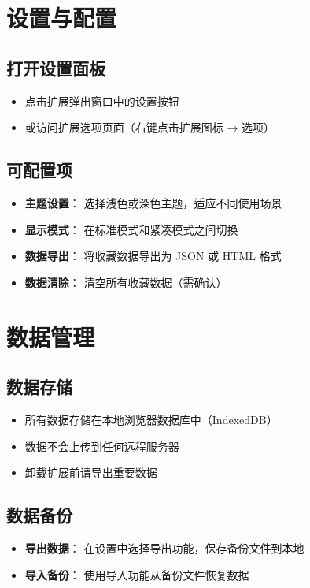 \documentclass[10pt,a4paper]{article}
\newcommand{\stepitem}[2]{%
  \item \textbf{#1}：#2
}
\begin{document}
\begin{itemize}
\begin{itemize}
\begin{itemize}
\section{设置与配置}

\subsection{打开设置面板}
\begin{itemize}
  \item 点击扩展弹出窗口中的设置按钮
  \item 或访问扩展选项页面（右键点击扩展图标 → 选项）
\end{itemize}

\subsection{可配置项}
\begin{itemize}
  \stepitem{主题设置}{%
    选择浅色或深色主题，适应不同使用场景
  }
  \stepitem{显示模式}{%
    在标准模式和紧凑模式之间切换
  }
  \stepitem{数据导出}{%
    将收藏数据导出为 JSON 或 HTML 格式
  }
  \stepitem{数据清除}{%
    清空所有收藏数据（需确认）
  }
\end{itemize}

\vspace{5pt}

\section{数据管理}

\subsection{数据存储}
\begin{itemize}
  \item 所有数据存储在本地浏览器数据库中（IndexedDB）
  \item 数据不会上传到任何远程服务器
  \item 卸载扩展前请导出重要数据
\end{itemize}

\subsection{数据备份}
\begin{itemize}
  \stepitem{导出数据}{%
    在设置中选择导出功能，保存备份文件到本地
  }
  \stepitem{导入备份}{%
    使用导入功能从备份文件恢复数据
  }
\end{itemize}


\end{itemize}
\end{itemize}
\end{itemize}
\end{document}
